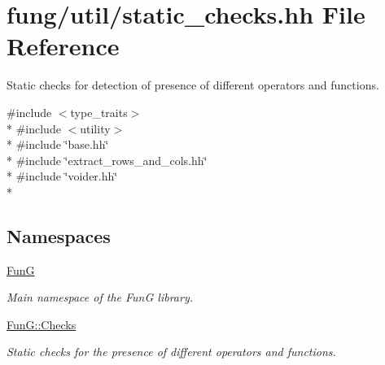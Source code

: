 \hypertarget{static__checks_8hh}{}\section{fung/util/static\+\_\+checks.hh File Reference}
\label{static__checks_8hh}


Static checks for detection of presence of different operators and functions.  


{\ttfamily \#include $<$type\+\_\+traits$>$}\\*
{\ttfamily \#include $<$utility$>$}\\*
{\ttfamily \#include \char`\"{}base.\+hh\char`\"{}}\\*
{\ttfamily \#include \char`\"{}extract\+\_\+rows\+\_\+and\+\_\+cols.\+hh\char`\"{}}\\*
{\ttfamily \#include \char`\"{}voider.\+hh\char`\"{}}\\*
\subsection*{Namespaces}
\begin{DoxyCompactItemize}
\item 
 \hyperlink{namespaceFunG}{Fun\+G}
\begin{DoxyCompactList}\small\item\em Main namespace of the Fun\+G library. \end{DoxyCompactList}\item 
 \hyperlink{namespaceFunG_1_1Checks}{Fun\+G\+::\+Checks}
\begin{DoxyCompactList}\small\item\em Static checks for the presence of different operators and functions. \end{DoxyCompactList}\end{DoxyCompactItemize}
